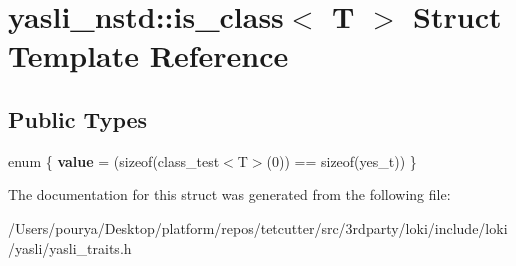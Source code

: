 \hypertarget{structyasli__nstd_1_1is__class}{}\section{yasli\+\_\+nstd\+:\+:is\+\_\+class$<$ T $>$ Struct Template Reference}
\label{structyasli__nstd_1_1is__class}
\subsection*{Public Types}
\begin{DoxyCompactItemize}
\item 
\hypertarget{structyasli__nstd_1_1is__class_ada6bb74906b4380a5bcd38e7f7ea3392}{}enum \{ {\bfseries value} = (sizeof(class\+\_\+test$<$T$>$(0)) == sizeof(yes\+\_\+t))
 \}\label{structyasli__nstd_1_1is__class_ada6bb74906b4380a5bcd38e7f7ea3392}

\end{DoxyCompactItemize}


The documentation for this struct was generated from the following file\+:\begin{DoxyCompactItemize}
\item 
/\+Users/pourya/\+Desktop/platform/repos/tetcutter/src/3rdparty/loki/include/loki/yasli/yasli\+\_\+traits.\+h\end{DoxyCompactItemize}

